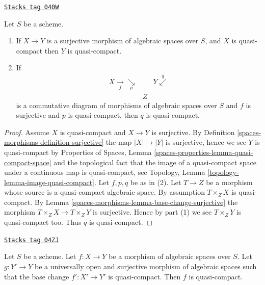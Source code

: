 \begin{lemma}
\label{spaces-morphisms-lemma-surjection-from-quasi-compact}
\href{https://stacks.math.columbia.edu/tag/040W}{\texttt{Stacks tag 040W}}


Let $S$ be a scheme.
\begin{enumerate}
\item If $X \to Y$ is a surjective morphism of algebraic spaces over $S$,
and $X$ is quasi-compact then $Y$ is quasi-compact.
\item If
$$
\begin{array}{ccc}X \underset{f}{\longrightarrow}\underset{p}{\searrow} &  & Y \overset{q}{\swarrow} \\  & Z & \end{array}
$$
is a commutative diagram of morphisms of algebraic spaces over $S$
and $f$ is surjective and $p$ is quasi-compact, then $q$ is quasi-compact.
\end{enumerate}
\end{lemma}

\begin{proof}
Assume $X$ is quasi-compact and $X \to Y$ is surjective. By
Definition \ref{spaces-morphisms-definition-surjective}
the map $|X| \to |Y|$ is surjective, hence we see $Y$ is quasi-compact by
Properties of Spaces, Lemma \ref{spaces-properties-lemma-quasi-compact-space}
and the topological fact that the image of a quasi-compact space under a
continuous map is quasi-compact, see
Topology, Lemma \ref{topology-lemma-image-quasi-compact}.
Let $f, p, q$ be as in (2).
Let $T \to Z$ be a morphism whose source is a quasi-compact algebraic space.
By assumption $T \times_Z X$ is quasi-compact. By
Lemma \ref{spaces-morphisms-lemma-base-change-surjective}
the morphism $T \times_Z X \to T \times_Z Y$ is surjective.
Hence by part (1) we see $T \times_Z Y$ is quasi-compact too.
Thus $q$ is quasi-compact.
\end{proof}

\begin{lemma}
\label{spaces-morphisms-lemma-descent-quasi-compact}
\href{https://stacks.math.columbia.edu/tag/04ZJ}{\texttt{Stacks tag 04ZJ}}

Let $S$ be a scheme.
Let $f : X \to Y$ be a morphism of algebraic spaces over $S$.
Let $g : Y' \to Y$ be a universally open and surjective morphism of
algebraic spaces such that the base change $f' : X' \to Y'$ is quasi-compact.
Then $f$ is quasi-compact.
\end{lemma}


